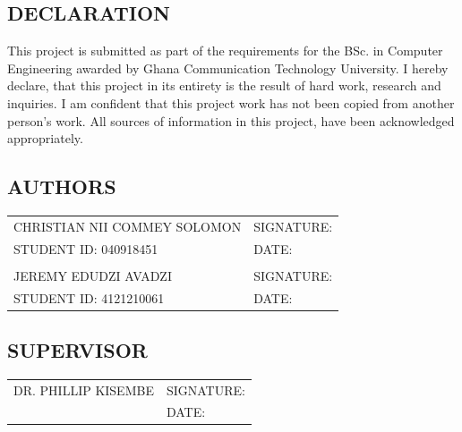 \documentclass[a4paper,12pt]{article}  %
\begin{document}
\newpage
\begin{center}
      \section*{DECLARATION}
      This project is submitted as part of the requirements for the BSc. in Computer Engineering awarded by Ghana Communication Technology University. I hereby declare, that this project in its entirety is the result of hard work, research and inquiries. I am confident that this project work has not been copied from another person’s work. All sources of information in this project, have been acknowledged appropriately.
\end{center}

\vspace{1cm}

\subsection*{AUTHORS}
\begin{tabular}{l l}
      \vspace{1cm}
      CHRISTIAN NII COMMEY SOLOMON & SIGNATURE: \underline{\hspace{5cm}} \\
      \vspace{1cm}
      STUDENT ID: 040918451        & DATE: \underline{\hspace{5cm}}      \\
                                   &                                     \\
      \vspace{1cm}
      JEREMY EDUDZI AVADZI         & SIGNATURE: \underline{\hspace{5cm}} \\
      STUDENT ID: 4121210061       & DATE: \underline{\hspace{5cm}}      \\
\end{tabular}

\vspace{1cm}

\subsection*{SUPERVISOR}
\begin{tabular}{l l}
      \vspace{1cm}
      DR. PHILLIP KISEMBE & SIGNATURE: \underline{\hspace{5cm}} \\
                          & DATE: \underline{\hspace{5cm}}      \\
\end{tabular}
\end{document}
